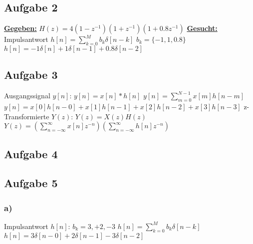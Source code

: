 \documentclass[12pt]{scrreprt}
\begin{document}
\subsection*{Aufgabe 2}
\underline{\textbf{Gegeben:}}\newline
\hspace*{5mm}$H(z)=4(1-z^{-1})(1+z^{-1})(1+0.8z^{-1})$\newline
\newline
\underline{\textbf{Gesucht:}}\newline
\hspace*{5mm}Impulsantwort $h[n]=\sum_{k=0}^{M} b_k \delta[n-k]$\newline
\hspace*{5mm}$b_k=\{-1, 1, 0.8\}$\newline
\hspace*{5mm}$h[n]=-1\delta[n]+1\delta[n-1]+0.8\delta[n-2]$

\subsection*{Aufgabe 3}
Ausgangssignal $y[n]$:\newline
\hspace*{5mm}$y[n]=x[n]*h[n]$\newline
\hspace*{5mm}$y[n]=\sum_{m=0}^{N-1}x[m]h[n-m]$\newline
\hspace*{5mm}$y[n]=x[0]h[n-0]+x[1]h[n-1]+x[2]h[n-2]+x[3]h[n-3]$\newline
\newpage
z-Transformierte $Y(z)$:\newline
\hspace*{5mm}$Y(z)=X(z)H(z)$\newline
\hspace*{5mm}$Y(z)=(\sum_{n=-\infty}^{\infty}x[n]z^{-n})(\sum_{n=-\infty}^{\infty}h[n]z^{-n})$

\subsection*{Aufgabe 4}

\subsection*{Aufgabe 5}
\subsubsection*{a)}
Impulsantwort $h[n]$:\newline
\hspace*{5mm}$b_k={3, +2, -3}$\newline
\hspace*{5mm}$h[n]=\sum_{k=0}^{M}b_k\delta[n-k]$\newline
\hspace*{5mm}$h[n]=3\delta[n-0] + 2\delta[n-1] - 3\delta[n-2]$\newline
\end{document}
